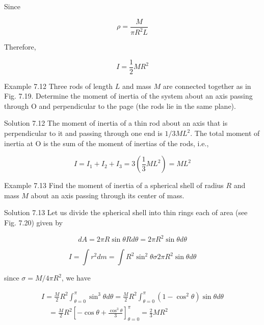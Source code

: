 \documentclass[10pt]{article}
\begin{document}
Since

$$
\rho=\frac{M}{\pi R^{2} L}
$$

Therefore,

$$
I=\frac{1}{2} M R^{2}
$$

Example 7.12 Three rods of length $L$ and mass $M$ are connected together as in Fig. 7.19. Determine the moment of inertia of the system about an axis passing through O and perpendicular to the page (the rods lie in the same plane).

Solution 7.12 The moment of inertia of a thin rod about an axis that is perpendicular to it and passing through one end is $1 / 3 M L^{2}$. The total moment of inertia at O is the sum of the moment of inertias of the rods, i.e.,

$$
I=I_{1}+I_{2}+I_{3}=3\left(\frac{1}{3} M L^{2}\right)=M L^{2}
$$

Example 7.13 Find the moment of inertia of a spherical shell of radius $R$ and mass $M$ about an axis passing through its center of mass.

Solution 7.13 Let us divide the spherical shell into thin rings each of area (see Fig. 7.20) given by

$$
d A=2 \pi R \sin \theta R d \theta=2 \pi R^{2} \sin \theta d \theta
$$

$$
I=\int r^{2} d m=\int R^{2} \sin ^{2} \theta \sigma 2 \pi R^{2} \sin \theta d \theta
$$

since $\sigma=M / 4 \pi R^{2}$, we have

$$
\begin{gathered}
I=\frac{M}{2} R^{2} \int_{\theta=0}^{\pi} \sin ^{3} \theta d \theta=\frac{M}{2} R^{2} \int_{\theta=0}^{\pi}\left(1-\cos ^{2} \theta\right) \sin \theta d \theta \\
\quad=\frac{M}{2} R^{2}\left[-\cos \theta+\frac{\cos ^{3} \theta}{3}\right]_{\theta=0}^{\pi}=\frac{2}{3} M R^{2}
\end{gathered}
$$
\end{document}
